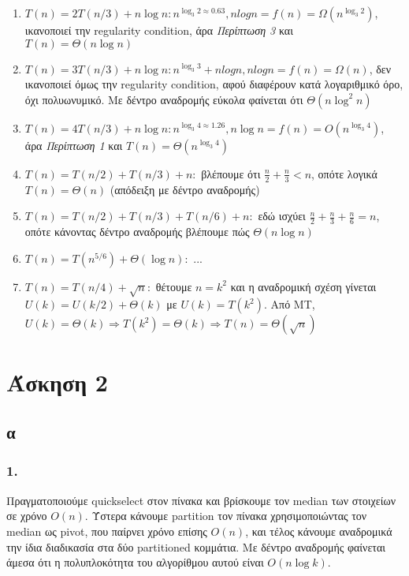 \documentclass[12pt,a4paper]{article}
\begin{document}
    \begin{enumerate}
      \item \( T(n) = 2T(n/3) + n\log{n} : n^{\log_{3}2 \approx 0.63 }, 
      nlogn = f(n) = \Omega(n^{\log_{3}2}) \), ικανοποιεί την {\latintext 
      regularity condition}, άρα \textit{Περίπτωση 3} και \( T(n)=\Theta(n\log{n}) \)
      \item \( T(n) = 3T(n/3) + n\log{n} : n^{\log_{3}3} + nlogn, nlogn = 
      f(n) = \Omega(n) \), δεν ικανοποιεί όμως την {\latintext regularity 
      condition}, αφού διαφέρουν κατά λογαριθμικό όρο, όχι πολυωνυμικό. Με δέντρο 
      αναδρομής εύκολα φαίνεται ότι \( \Theta(n\log^{2}{n}) \)
      \item \( T(n) = 4T(n/3) + n\log{n} : n^{\log_{3}{4} \approx 1.26}, n\log{n} =
      f(n) = O(n^{\log_{3}4}) \), άρα \textit{Περίπτωση 1} και \( Τ(n) = 
      \Theta(n^{\log_{3}{4}}) \)
      \item \( T(n) = T(n/2) + T(n/3) + n : \) βλέπουμε ότι \( \frac{n}{2} + 
      \frac{n}{3} < n \), οπότε λογικά \( T(n) = \Theta(n) \) (απόδειξη με δέντρο
      αναδρομής)
      \item \( Τ(n) = T(n/2) + T(n/3) + T(n/6) + n : \) εδώ ισχύει \( \frac{n}{2} 
      + \frac{n}{3} + \frac{n}{6} = n \), οπότε κάνοντας δέντρο αναδρομής βλέπουμε
      πώς \( \Theta(n\log{n}) \) 
      \item \( T(n) = T(n^{5/6}) + \Theta(\log{n}) : \) ...
      \item \( T(n) = T(n/4) + \sqrt{n} : \) θέτουμε \(n=k^2\) και η αναδρομική 
      σχέση γίνεται \( U(k) = U(k/2) + \Theta(k) \) με \( U(k)=T(k^2) \). Από 
      {\latintext MT}, \( U(k)=\Theta(k) \Rightarrow T(k^2)=\Theta(k) \Rightarrow 
      T(n)=\Theta(\sqrt{n}) \)
    \end{enumerate}

  \section{Άσκηση 2}

  \subsection{α}

  \subsubsection{1.}
    Πραγματοποιούμε {\latintext quickselect} στον πίνακα και βρίσκουμε τον
    {\latintext median} των στοιχείων σε χρόνο \( Ο(n) \).
    Ύστερα κάνουμε {\latintext partition} τον πίνακα χρησιμοποιώντας τον
    {\latintext median} ως {\latintext pivot}, που παίρνει χρόνο επίσης \( Ο(n) \), 
    και τέλος κάνουμε αναδρομικά την ίδια διαδικασία στα δύο {\latintext partitioned} 
    κομμάτια.
    Με δέντρο αναδρομής φαίνεται άμεσα ότι η πολυπλοκότητα του αλγορίθμου
    αυτού είναι \( Ο(n\log{k}) \).
\end{document}
